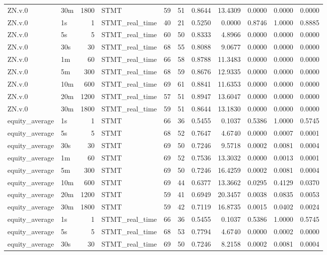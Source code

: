 \begin{tabular}{llrlrrrrrrr}
ZN.v.0 & 30m & 1800 & STMT & 59 & 51 & 0.8644 & 13.4309 & 0.0000 & 0.0000 & 0.0000 \\
ZN.v.0 & 1s & 1 & STMT_real_time & 40 & 21 & 0.5250 & 0.0000 & 0.8746 & 1.0000 & 0.8885 \\
ZN.v.0 & 5s & 5 & STMT_real_time & 60 & 50 & 0.8333 & 4.8966 & 0.0000 & 0.0000 & 0.0000 \\
ZN.v.0 & 30s & 30 & STMT_real_time & 68 & 55 & 0.8088 & 9.0677 & 0.0000 & 0.0000 & 0.0000 \\
ZN.v.0 & 1m & 60 & STMT_real_time & 66 & 58 & 0.8788 & 11.3483 & 0.0000 & 0.0000 & 0.0000 \\
ZN.v.0 & 5m & 300 & STMT_real_time & 68 & 59 & 0.8676 & 12.9335 & 0.0000 & 0.0000 & 0.0000 \\
ZN.v.0 & 10m & 600 & STMT_real_time & 69 & 61 & 0.8841 & 11.6353 & 0.0000 & 0.0000 & 0.0000 \\
ZN.v.0 & 20m & 1200 & STMT_real_time & 57 & 51 & 0.8947 & 13.6047 & 0.0000 & 0.0000 & 0.0000 \\
ZN.v.0 & 30m & 1800 & STMT_real_time & 59 & 51 & 0.8644 & 13.1830 & 0.0000 & 0.0000 & 0.0000 \\
equity_average & 1s & 1 & STMT & 66 & 36 & 0.5455 & 0.1037 & 0.5386 & 1.0000 & 0.5745 \\
equity_average & 5s & 5 & STMT & 68 & 52 & 0.7647 & 4.6740 & 0.0000 & 0.0007 & 0.0001 \\
equity_average & 30s & 30 & STMT & 69 & 50 & 0.7246 & 9.5718 & 0.0002 & 0.0081 & 0.0004 \\
equity_average & 1m & 60 & STMT & 69 & 52 & 0.7536 & 13.3032 & 0.0000 & 0.0013 & 0.0001 \\
equity_average & 5m & 300 & STMT & 69 & 50 & 0.7246 & 16.4259 & 0.0002 & 0.0081 & 0.0004 \\
equity_average & 10m & 600 & STMT & 69 & 44 & 0.6377 & 13.3662 & 0.0295 & 0.4129 & 0.0370 \\
equity_average & 20m & 1200 & STMT & 59 & 41 & 0.6949 & 20.3457 & 0.0038 & 0.0835 & 0.0053 \\
equity_average & 30m & 1800 & STMT & 59 & 42 & 0.7119 & 16.8735 & 0.0015 & 0.0402 & 0.0024 \\
equity_average & 1s & 1 & STMT_real_time & 66 & 36 & 0.5455 & 0.1037 & 0.5386 & 1.0000 & 0.5745 \\
equity_average & 5s & 5 & STMT_real_time & 68 & 53 & 0.7794 & 4.6740 & 0.0000 & 0.0002 & 0.0000 \\
equity_average & 30s & 30 & STMT_real_time & 69 & 50 & 0.7246 & 8.2158 & 0.0002 & 0.0081 & 0.0004 \\

\end{tabular}
